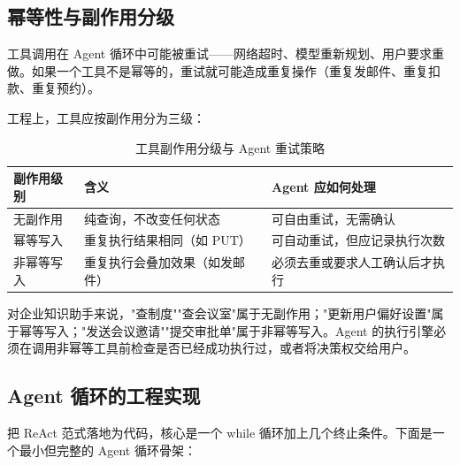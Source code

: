 \subsection{幂等性与副作用分级}
工具调用在 Agent 循环中可能被重试——网络超时、模型重新规划、用户要求重做。如果一个工具不是幂等的，重试就可能造成重复操作（重复发邮件、重复扣款、重复预约）。

工程上，工具应按副作用分为三级：

\begin{table}[H]
\centering
\small
\begin{tabularx}{\textwidth}{>{\raggedright\arraybackslash}p{2.2cm}>{\raggedright\arraybackslash}p{3.8cm}>{\raggedright\arraybackslash}X}
\toprule
\textbf{副作用级别} & \textbf{含义} & \textbf{Agent 应如何处理} \\
\midrule
无副作用 & 纯查询，不改变任何状态 & 可自由重试，无需确认 \\
幂等写入 & 重复执行结果相同（如 PUT） & 可自动重试，但应记录执行次数 \\
非幂等写入 & 重复执行会叠加效果（如发邮件） & 必须去重或要求人工确认后才执行 \\
\bottomrule
\end{tabularx}
\caption{工具副作用分级与 Agent 重试策略}
\label{tab:tool-side-effects}
\end{table}

对企业知识助手来说，"查制度""查会议室"属于无副作用；"更新用户偏好设置"属于幂等写入；"发送会议邀请""提交审批单"属于非幂等写入。Agent 的执行引擎必须在调用非幂等工具前检查是否已经成功执行过，或者将决策权交给用户。

\subsection{Agent 循环的工程实现}
把 ReAct 范式落地为代码，核心是一个 while 循环加上几个终止条件。下面是一个最小但完整的 Agent 循环骨架：

